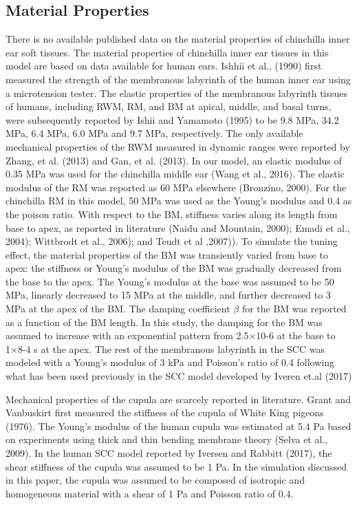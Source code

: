 \documentclass[12pt]{article}
\begin{document}
\subsection{Material Properties}
There is no available published data on the material properties of chinchilla inner ear soft tissues. The material properties of chinchilla inner ear tissues in this model are based on data available for human ears. Ishhii et al., (1990) first measured the strength of the membranous labyrinth of the human inner ear using a microtension tester. The elastic properties of the membranous labyrinth tissues of humans, including RWM, RM, and BM at apical, middle, and basal turns, were subsequently reported by Ishii and Yamamoto (1995) to be 9.8 MPa, 34.2 MPa, 6.4 MPa, 6.0 MPa and 9.7 MPa, respectively. The only available mechanical properties of the RWM measured in dynamic ranges were reported by Zhang, et al. (2013) and Gan, et al. (2013). In our model, an elastic modulus of 0.35 MPa was used for the chinchilla middle ear  (Wang et al., 2016). The elastic modulus of the RM was reported as 60 MPa elsewhere (Bronzino, 2000). For the chinchilla RM in this model, 50 MPa was used as the Young’s modulus and 0.4 as the poison ratio. With respect to the BM, stiffness varies along its length from base to apex, as reported in literature (Naidu and Mountain, 2000); Emadi et al., 2004); Wittbrodt et al., 2006); and Teudt et al ,2007)). To simulate the tuning effect, the material properties of the BM was transiently varied from base to apex: the stiffness or Young’s modulus of the BM was gradually decreased from the base to the apex. The Young’s modulus at the base was assumed to be 50 MPa, linearly decreased to 15 MPa at the middle, and further decreased to 3 MPa at the apex of the BM. The damping coefficient $\beta$ for the BM was reported as a function of the BM length. In this study, the damping for the BM was assumed to increase with an exponential pattern from 2.5×10-6 at the base to 1×8-4 s at the apex. The rest of the membranous labyrinth in the SCC was modeled with a Young’s modulus of 3 kPa and Poisson’s ratio of 0.4 following what has been used previously in the SCC model developed by Iveren et.al (2017)

Mechanical properties of the cupula are scarcely reported in literature. Grant and Vanbuskirt first measured the stiffness of the cupula of White King pigeons (1976). The Young’s modulus of the human cupula was estimated at 5.4 Pa based on experiments using thick and thin bending membrane theory (Selva et al., 2009). In the human SCC model reported by Iversen and Rabbitt (2017), the shear stiffness of the cupula was assumed to be 1 Pa. In the simulation discussed in this paper, the cupula was assumed to be composed of isotropic and homogeneous material with a shear of 1 Pa and Poisson ratio of 0.4. 
\end{document}
